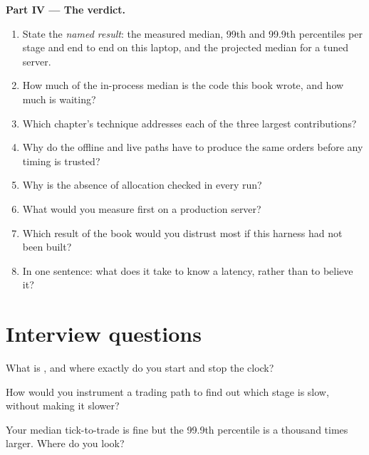 \begin{problem}
\medskip\noindent\textbf{Part IV --- The verdict.}
\begin{enumerate}[resume]
\item State the \emph{named result}: the measured median, 99th and 99.9th percentiles per stage and end to end on this laptop,
and the projected median for a tuned server.
\item How much of the in-process median is the code this book wrote, and how much is waiting?
\item Which chapter's technique addresses each of the three largest contributions?
\item Why do the offline and live paths have to produce the same orders before any timing is trusted?
\item Why is the absence of allocation checked in every run?
\item What would you measure first on a production server?
\item Which result of the book would you distrust most if this harness had not been built?
\item In one sentence: what does it take to know a latency, rather than to believe it?
\end{enumerate}
\end{problem}

\section{Interview questions}

\begin{interviewq}\label{iq:ll:build-tick-to-trade-measured:1}
What is , and where exactly do you start and stop the clock?
\end{interviewq}

\begin{interviewq}\label{iq:ll:build-tick-to-trade-measured:2}
How would you instrument a trading path to find out which stage is slow, without making it slower?
\end{interviewq}

\begin{interviewq}\label{iq:ll:build-tick-to-trade-measured:3}
Your median tick-to-trade is fine but the 99.9th percentile is a thousand times larger. Where do you look?
\end{interviewq}

